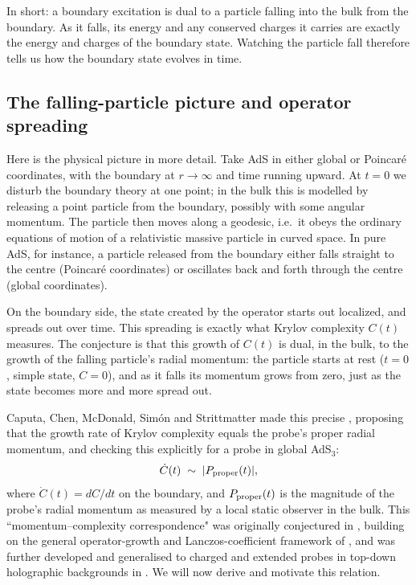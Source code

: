 \documentclass[11pt]{article}
\begin{document}
In short: a boundary excitation is dual to a particle falling into the bulk from the boundary. As it falls, its energy and any conserved charges it carries are exactly the energy and charges of the boundary state. Watching the particle fall therefore tells us how the boundary state evolves in time.

\subsection{The falling-particle picture and operator spreading}

Here is the physical picture in more detail. Take AdS in either global or Poincar\'e coordinates, with the boundary at $r\to\infty$ and time running upward. At $t=0$ we disturb the boundary theory at one point; in the bulk this is modelled by releasing a point particle from the boundary, possibly with some angular momentum. The particle then moves along a geodesic, i.e.\ it obeys the ordinary equations of motion of a relativistic massive particle in curved space. In pure AdS, for instance, a particle released from the boundary either falls straight to the centre (Poincar\'e coordinates) or oscillates back and forth through the centre (global coordinates).

On the boundary side, the state created by the operator starts out localized, and spreads out over time. This spreading is exactly what Krylov complexity $C(t)$ measures. The conjecture is that this growth of $C(t)$ is dual, in the bulk, to the growth of the falling particle's radial momentum: the particle starts at rest ($t=0$, simple state, $C=0$), and as it falls its momentum grows from zero, just as the state becomes more and more spread out.

Caputa, Chen, McDonald, Sim\'on and Strittmatter made this precise \cite{Caputa:2024odg}, proposing that the growth rate of Krylov complexity equals the probe's proper radial momentum, and checking this explicitly for a probe in global AdS$_3$:
\begin{equation}
    \dot C(t) \;\sim\; |P_{\rm proper}(t)|,
    \label{eq:proper-momentum-proposal}
\end{equation}
where $\dot C(t)=dC/dt$ on the boundary, and $P_{\rm proper}(t)$ is the magnitude of the probe's radial momentum as measured by a local static observer in the bulk.  This ``momentum--complexity correspondence" was originally conjectured in \cite{Caputa:2024odg}, building on the general operator-growth and Lanczos-coefficient framework of \cite{Parker:2018yvk,Balasubramanian:2022tpr}, and was further developed and generalised to charged and extended probes in top-down holographic backgrounds in \cite{Nastase:2026lhz,Fatemiabhari:2026rob,Chatzis:2026ekd}.  We will now derive and motivate this relation.
\end{document}
